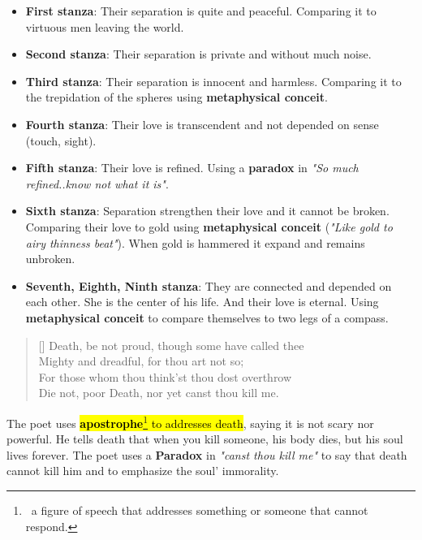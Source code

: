 \begin{itemize}
  \item \textbf{First stanza}: Their separation is quite and peaceful. Comparing it to virtuous men leaving the world.
  \item \textbf {Second stanza}: Their separation is private and without much noise.
  \item \textbf {Third stanza}: Their separation is innocent and harmless. Comparing it to the trepidation of the spheres using
    \textbf{metaphysical conceit}.
  \item \textbf {Fourth stanza}: Their love is transcendent and not depended on sense (touch, sight). 
  \item \textbf {Fifth stanza}: Their love is refined. Using a \textbf{paradox} in 
    \textit{"So much refined..know not what it is"}.
  \item \textbf {Sixth stanza}: Separation strengthen their love and it cannot be broken. Comparing their love 
    to gold using \textbf{metaphysical conceit} (\textit{"Like gold to airy thinness beat"}). 
    When gold is hammered it expand and remains unbroken.
  \item \textbf {Seventh, Eighth, Ninth stanza}: They are connected and depended on each other. 
    She is the center of his life. And their love is eternal.
    Using \textbf{metaphysical conceit} to compare themselves to two legs of a compass.
\end{itemize}

\settowidth{\versewidth}{Death, be not proud, though some have called thee}
\begin{verse}[\versewidth]
{\fontverse
Death, be not proud, though some have called thee\\
Mighty and dreadful, for thou art not so;\\
For those whom thou think'st thou dost overthrow\\
Die not, poor Death, nor yet canst thou kill me.
} 
\end{verse}

The poet uses \hl{\textbf{apostrophe}\footnote{\, a figure of speech that addresses something or someone that cannot respond.}
to addresses death}, saying it is not scary nor powerful. He tells death that when you kill someone, his body 
dies, but his soul lives forever. The poet uses a \textbf{Paradox} in \textit{"canst thou kill me"} to say that 
death cannot kill him and to emphasize the soul' immorality.

